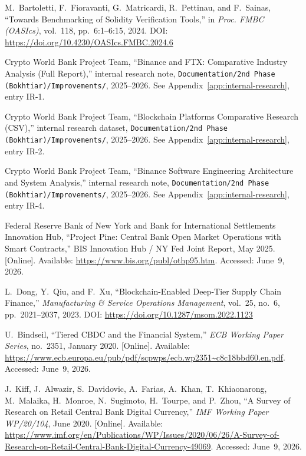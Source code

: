 \documentclass[12pt,a4paper]{report}
\begin{document}
{\begin{enumerate}[label={[\arabic*]}]
\item M.~Bartoletti, F.~Fioravanti, G.~Matricardi, R.~Pettinau, and F.~Sainas, ``Towards Benchmarking of Solidity Verification Tools,'' in \textit{Proc. FMBC (OASIcs)}, vol.~118, pp.~6:1--6:15, 2024. DOI: \url{https://doi.org/10.4230/OASIcs.FMBC.2024.6}
\item Crypto World Bank Project Team, ``Binance and FTX: Comparative Industry Analysis (Full Report),'' internal research note, \texttt{Documentation/2nd Phase (Bokhtiar)/Improvements/}, 2025--2026. See Appendix~\ref{app:internal-research}, entry IR-1.

\item Crypto World Bank Project Team, ``Blockchain Platforms Comparative Research (CSV),'' internal research dataset, \texttt{Documentation/2nd Phase (Bokhtiar)/Improvements/}, 2025--2026. See Appendix~\ref{app:internal-research}, entry IR-2.

\item Crypto World Bank Project Team, ``Binance Software Engineering Architecture and System Analysis,'' internal research note, \texttt{Documentation/2nd Phase (Bokhtiar)/Improvements/}, 2025--2026. See Appendix~\ref{app:internal-research}, entry IR-4.

\item Federal Reserve Bank of New York and Bank for International Settlements Innovation Hub, ``Project Pine: Central Bank Open Market Operations with Smart Contracts,'' BIS Innovation Hub / NY Fed Joint Report, May 2025. [Online]. Available: \url{https://www.bis.org/publ/othp95.htm}. Accessed: June~9, 2026.

\item L.~Dong, Y.~Qiu, and F.~Xu, ``Blockchain-Enabled Deep-Tier Supply Chain Finance,'' \textit{Manufacturing \& Service Operations Management}, vol.~25, no.~6, pp.~2021--2037, 2023. DOI: \url{https://doi.org/10.1287/msom.2022.1123}

\item U.~Bindseil, ``Tiered CBDC and the Financial System,'' \textit{ECB Working Paper Series}, no.~2351, January 2020. [Online]. Available: \url{https://www.ecb.europa.eu/pub/pdf/scpwps/ecb.wp2351~c8c18bbd60.en.pdf}. Accessed: June~9, 2026.

\item J.~Kiff, J.~Alwazir, S.~Davidovic, A.~Farias, A.~Khan, T.~Khiaonarong, M.~Malaika, H.~Monroe, N.~Sugimoto, H.~Tourpe, and P.~Zhou, ``A Survey of Research on Retail Central Bank Digital Currency,'' \textit{IMF Working Paper WP/20/104}, June 2020. [Online]. Available: \url{https://www.imf.org/en/Publications/WP/Issues/2020/06/26/A-Survey-of-Research-on-Retail-Central-Bank-Digital-Currency-49069}. Accessed: June~9, 2026.


\end{enumerate}}
\end{document}
